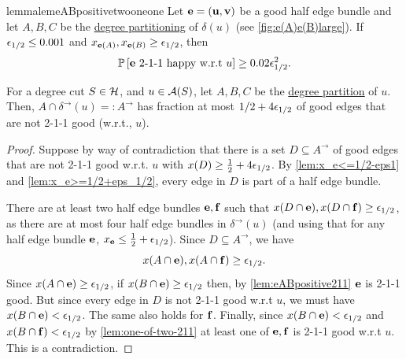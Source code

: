 \begin{restatable}{lemma}{lemeABpositivetwooneone}\label{lem:eABpositive211}
Let ${\bf e}={\bf (u,v)}$ be a good half edge bundle and 	let $A,B,C$ be the \hyperlink{tar:degreepartition}{degree partitioning} of $\delta(u)$ (see \cref{fig:e(A)e(B)large}).  If ${\epsilon}_{1/2}\leq 0.001$ and $x_{{\bf e}(A)},x_{{\bf e}(B)}\geq {\epsilon}_{1/2}$, %
 then
$$ {\mathbb{P}}\left[{\bf e} \text{ 2-1-1 happy w.r.t } u\right] \geq 0.02{\epsilon}_{1/2}^2. $$
\end{restatable}

\begin{lemma}\label{lem:Ais211good}
For a degree cut $S\in\mathcal{H}$, and $u\in {\cal A}(S)$, let $A,B,C$ be the \hyperlink{tar:degreepartition}{degree partition} of $u$. Then, $A\cap\delta^\rightarrow(u)=:A^\rightarrow$ has fraction at most $1/2+4{\epsilon}_{1/2}$ of good edges that are not 2-1-1 good (w.r.t., $u$).
\end{lemma}
\begin{proof}  
	Suppose by way of contradiction that there is a set $D \subseteq A^\rightarrow$ of good edges that are not 2-1-1 good w.r.t. $u$ with $x(D) \ge \frac{1}{2}+4{\epsilon}_{1/2}$. By \cref{lem:x_e<=1/2-eps1} and \cref{lem:x_e>=1/2+eps_1/2}, every edge in $D$ is part of a half edge bundle.  
	
	There are at least two half edge bundles ${\bf e},{\bf f}$ such that $x(D \cap {\bf e}), x(D \cap {\bf f}) \ge {\epsilon}_{1/2}$, as there are at most four half edge bundles in $\delta^\rightarrow(u)$ (and using that for any half edge bundle ${\bf e}$, $x_{\bf e} \le \frac{1}{2}+{\epsilon}_{1/2}$). %
	Since $D\subseteq A^\rightarrow$, we have 
	$$x(A \cap {\bf e}),x(A \cap {\bf f}) \ge {\epsilon}_{1/2}.$$ 
	Since $x(A\cap {\bf e})\geq {\epsilon}_{1/2}$, if $x(B\cap {\bf e})\geq {\epsilon}_{1/2}$ then, by \cref{lem:eABpositive211} ${\bf e}$ is 2-1-1 good. But since  every edge in $D$ is not 2-1-1 good w.r.t $u$, we must have $x(B\cap {\bf e}) <{\epsilon}_{1/2}$. The same also holds for ${\bf f}$. %
	Finally, since $x(B\cap {\bf e})<{\epsilon}_{1/2}$ and $x(B\cap {\bf f})<{\epsilon}_{1/2}$ by \cref{lem:one-of-two-211}  at least one of ${\bf e},{\bf f}$ is 2-1-1 good w.r.t $u$. This is a contradiction.
\end{proof}

